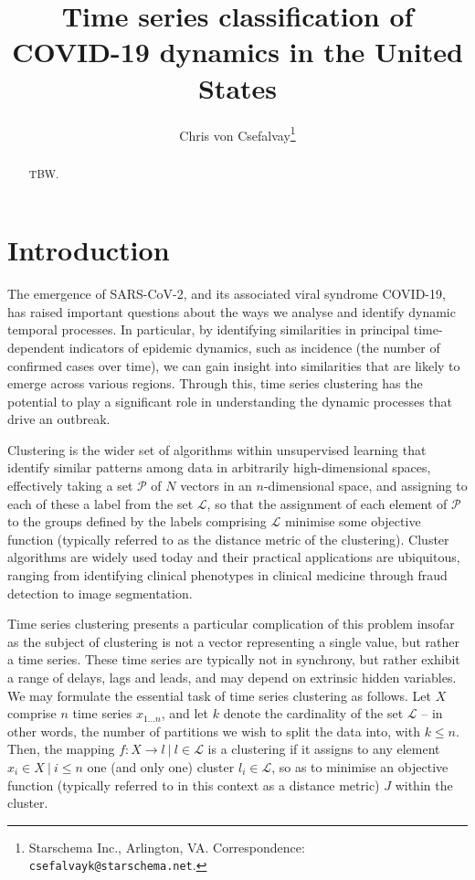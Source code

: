 \documentclass{article}
\title{Time series classification of COVID-19 dynamics in the United States}
\author{Chris von Csefalvay\thanks{Starschema Inc., Arlington, VA. Correspondence: \texttt{csefalvayk@starschema.net}.}}
\begin{document}
\maketitle

\begin{abstract}
    TBW.
\end{abstract}


\section{Introduction} %
\label{sec:introduction}

The emergence of SARS-CoV-2, and its associated viral syndrome COVID-19, has raised important questions about the ways we analyse and identify dynamic temporal processes. In particular, by identifying similarities in principal time-dependent indicators of epidemic dynamics, such as incidence (the number of confirmed cases over time), we can gain insight into similarities that are likely to emerge across various regions. Through this, time series clustering has the potential to play a significant role in understanding the dynamic processes that drive an outbreak.

Clustering is the wider set of algorithms within unsupervised learning that identify similar patterns among data in arbitrarily high-dimensional spaces, effectively taking a set $\mathcal{P}$ of $N$ vectors in an $n$-dimensional space, and assigning to each of these a label from the set $\mathcal{L}$, so that the assignment of each element of $\mathcal{P}$ to the groups defined by the labels comprising $\mathcal{L}$ minimise some objective function (typically referred to as the distance metric of the clustering). Cluster algorithms are widely used today and their practical applications are ubiquitous, ranging from identifying clinical phenotypes in clinical medicine\cite{ahmad2014clinical,haldar2008cluster,lochner2005cluster,weatherall2009distinct,ye2014different} through fraud detection\cite{behera2015credit,liu2013healthcare,peng2006application,sabau2012survey,subudhi2017use} to image segmentation.\cite{chuang2006fuzzy,coleman1979image,jin2018accelerating,lafata2018data,pappas1989adaptive,wu1993optimal}

Time series clustering presents a particular complication of this problem insofar as the subject of clustering is not a vector representing a single value, but rather a time series. These time series are typically not in synchrony, but rather exhibit a range of delays, lags and leads, and may depend on extrinsic hidden variables. We may formulate the essential task of time series clustering as follows. Let $X$ comprise $n$ time series $x_{1 \ldots n}$, and let $k$ denote the cardinality of the set $\mathcal{L}$ -- in other words, the number of partitions we wish to split the data into, with $k \leq n$. Then, the mapping $f: X \rightarrow l \ | \ l \in \mathcal{L}$ is a clustering if it assigns to any element $x_i \in X \ | \ i \leq n$ one (and only one) cluster $l_i \in \mathcal{L}$, so as to minimise an objective function (typically referred to in this context as a distance metric) $J$ within the cluster.
\end{document}

